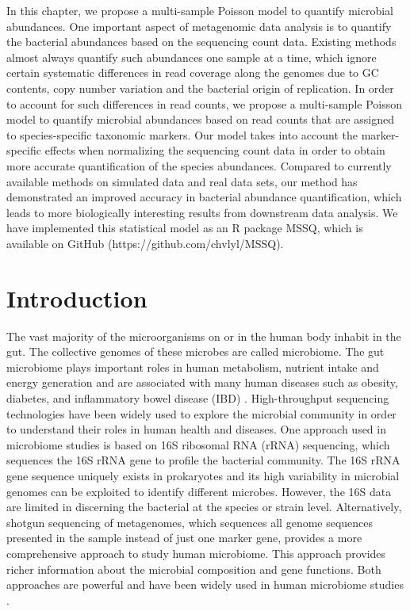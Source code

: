  \label{chpt3:MSSQ}

In this chapter, we propose a multi-sample Poisson model to quantify microbial abundances. One important aspect of metagenomic data analysis is to quantify the bacterial abundances based on the sequencing count data. Existing methods almost always quantify such abundances one sample at a time, which ignore certain systematic differences in read coverage along the genomes due to GC contents, copy number variation and the bacterial origin of replication. In order to account for such differences in read counts, we propose a multi-sample Poisson model to quantify microbial abundances based on read counts that are assigned to species-specific taxonomic markers. Our model takes into account the marker-specific effects when normalizing the sequencing count data in order to obtain more accurate quantification of the species abundances. Compared to currently available methods on simulated data and real data sets, our method has demonstrated an improved accuracy in bacterial abundance quantification, which leads to more biologically interesting results from downstream data analysis. We have implemented this statistical model as an R package MSSQ, which is available on GitHub (https://github.com/chvlyl/MSSQ).


\section{Introduction}
The vast majority of the microorganisms on or in the human body inhabit in the gut. The collective genomes of these microbes are called microbiome. The gut microbiome plays important roles in human metabolism, nutrient intake and energy generation and are associated with many human diseases such as obesity, diabetes, and inflammatory bowel disease (IBD) \citep{Cox:2014hy, lewis2015inflammation, Cho:2012cn}. High-throughput sequencing technologies have been widely used to explore the microbial community in order to understand their roles in human health and diseases. One approach used in microbiome studies is based on 16S ribosomal RNA (rRNA) sequencing, which sequences the 16S rRNA gene to profile the bacterial community. The 16S rRNA gene sequence uniquely exists in prokaryotes and its high variability in microbial genomes can be exploited to identify different microbes. However, the 16S data are limited in discerning the bacterial at the species or strain level. Alternatively, shotgun sequencing of metagenomes, which sequences all genome sequences presented in the sample instead of just one marker gene, provides a more comprehensive approach to study human microbiome. This approach provides richer information about the microbial composition and gene functions. Both approaches are powerful and have been widely used in human microbiome studies \citep{turnbaugh2007human, qin2010human}.

